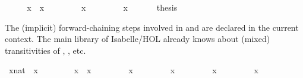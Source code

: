 \begin{isabellebody}
\isamarkupfalse%
\ {\isacharminus}\isanewline
\ \ \isamarkupfalse%
\ {\isachardoublequote}x{}\ {\isacharequal}\ x{}{\isachardoublequote}\ \isamarkupfalse%
\isanewline
\ \ \isamarkupfalse%
\ \isamarkupfalse%
\ {\isachardoublequote}{\isasymdots}\ {\isacharequal}\ x{}{\isachardoublequote}\ \isamarkupfalse%
\isanewline
\ \ \isamarkupfalse%
\ \isamarkupfalse%
\ {\isachardoublequote}{\isasymdots}\ {\isacharequal}\ x{}{\isachardoublequote}\ \isamarkupfalse%
\isanewline
\ \ \isamarkupfalse%
\ \isamarkupfalse%
\ {\isacharquery}thesis\ \isamarkupfalse%
\isacommand{{\isachardot}}\isanewline
\isamarkupfalse%
\isamarkupfalse%
%
\begin{isamarkuptext}%
The (implicit) forward-chaining steps involved in  and
   are declared in the current context.  The main library
  of Isabelle/HOL already knows about (mixed) transitivities of \isa{{\isacharequal}}, \isa{{\isacharless}}, \isa{{\isasymle}} etc.%
\end{isamarkuptext}%
\isamarkuptrue%
\ {\isachardoublequote}{\isacharparenleft}x{}{\isacharcolon}{\isacharcolon}nat{\isacharparenright}\ {\isacharless}\ x{}{\isachardoublequote}\isanewline
\ \ %
\isanewline
\isamarkupfalse%
\ {\isacharminus}\isanewline
\ \ \isamarkupfalse%
\ {\isachardoublequote}x{}\ {\isacharless}\ x{}{\isachardoublequote}\ \isamarkupfalse%
\isanewline
\ \ \isamarkupfalse%
\ \isamarkupfalse%
\ {\isachardoublequote}{\isasymdots}\ {\isasymle}\ x{}{\isachardoublequote}\ \isamarkupfalse%
\isanewline
\ \ \isamarkupfalse%
\ \isamarkupfalse%
\ {\isachardoublequote}{\isasymdots}\ {\isacharequal}\ x{}{\isachardoublequote}\ \isamarkupfalse%
\isanewline
\ \ \isamarkupfalse%
\ \isamarkupfalse%
\ {\isachardoublequote}{\isasymdots}\ {\isacharless}\ x{}{\isachardoublequote}\ \isamarkupfalse%
\isanewline
\ \ \isamarkupfalse%
\ \isamarkupfalse%
\ {\isachardoublequote}{\isasymdots}\ {\isacharequal}\ x{}{\isachardoublequote}\ \isamarkupfalse%

\end{isabellebody}

